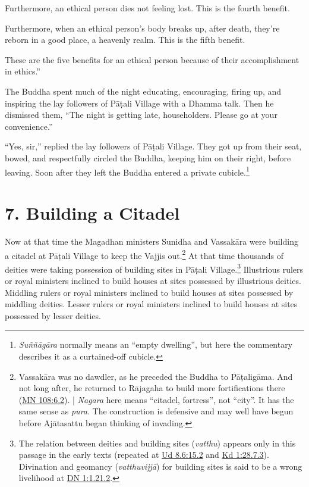\documentclass[12pt,openany]{book}%
\begin{document}
Furthermore, an ethical person dies not feeling lost. This is the fourth benefit. 

Furthermore, when an ethical person’s body breaks up, after death, they’re reborn in a good place, a heavenly realm. This is the fifth benefit. 

These are the five benefits for an ethical person because of their accomplishment in ethics.” 

The Buddha spent much of the night educating, encouraging, firing up, and inspiring the lay followers of \textsanskrit{Pāṭali} Village with a Dhamma talk. Then he dismissed them, “The night is getting late, householders. Please go at your convenience.” 

“Yes, sir,” replied the lay followers of \textsanskrit{Pāṭali} Village. They got up from their seat, bowed, and respectfully circled the Buddha, keeping him on their right, before leaving. Soon after they left the Buddha entered a private cubicle.\footnote{\textit{\textsanskrit{Suññāgāra}} normally means an “empty dwelling”, but here the commentary describes it as a curtained-off cubicle. } 

\section*{7. Building a Citadel }

Now at that time the Magadhan ministers Sunidha and \textsanskrit{Vassakāra} were building a citadel at \textsanskrit{Pāṭali} Village to keep the Vajjis out.\footnote{\textsanskrit{Vassakāra} was no dawdler, as he preceded the Buddha to \textsanskrit{Pāṭaligāma}. And not long after, he returned to \textsanskrit{Rājagaha} to build more fortifications there (\href{https://suttacentral.net/mn108/en/sujato\#6.2}{MN 108:6.2}). | \textit{Nagara} here means “citadel, fortress”, not “city”. It has the same sense as \textit{pura}. The construction is defensive and may well have begun before \textsanskrit{Ajātasattu} began thinking of invading. } At that time thousands of deities were taking possession of building sites in \textsanskrit{Pāṭali} Village.\footnote{The relation between deities and building sites (\textit{vatthu}) appears only in this passage in the early texts (repeated at \href{https://suttacentral.net/ud8.6/en/sujato\#15.2}{Ud 8.6:15.2} and \href{https://suttacentral.net/pli-tv-kd1/en/sujato\#28.7.3}{Kd 1:28.7.3}). Divination and geomancy (\textit{\textsanskrit{vatthuvijjā}}) for building sites is said to be a wrong livelihood at \href{https://suttacentral.net/dn1/en/sujato\#1.21.2}{DN 1:1.21.2}. } Illustrious rulers or royal ministers inclined to build houses at sites possessed by illustrious deities. Middling rulers or royal ministers inclined to build houses at sites possessed by middling deities. Lesser rulers or royal ministers inclined to build houses at sites possessed by lesser deities. 
\end{document}
